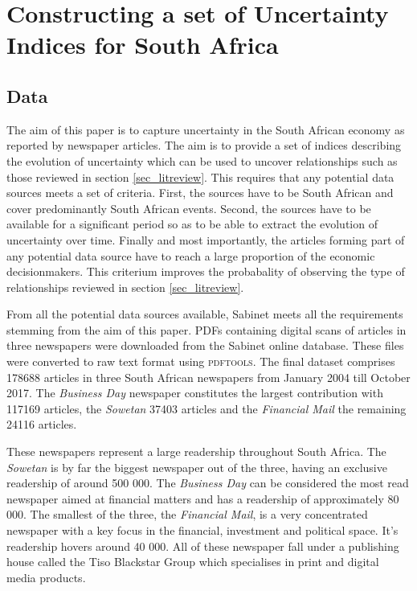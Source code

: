 \documentclass[11pt,preprint, authoryear]{elsarticle}
\numberwithin{equation}{section}
\numberwithin{figure}{section}
\numberwithin{table}{section}
\begin{document}
\section{\texorpdfstring{Constructing a set of Uncertainty Indices for
South Africa
\label{sec_EPU}}{Constructing a set of Uncertainty Indices for South Africa }}\label{constructing-a-set-of-uncertainty-indices-for-south-africa}

\subsection{\texorpdfstring{Data \label{sec_data}}{Data }}\label{data}

The aim of this paper is to capture uncertainty in the South African
economy as reported by newspaper articles. The aim is to provide a set
of indices describing the evolution of uncertainty which can be used to
uncover relationships such as those reviewed in section
\ref{sec_litreview}. This requires that any potential data sources meets
a set of criteria. First, the sources have to be South African and cover
predominantly South African events. Second, the sources have to be
available for a significant period so as to be able to extract the
evolution of uncertainty over time. Finally and most importantly, the
articles forming part of any potential data source have to reach a large
proportion of the economic decisionmakers. This criterium improves the
probabality of observing the type of relationships reviewed in section
\ref{sec_litreview}.

From all the potential data sources available, Sabinet meets all the
requirements stemming from the aim of this paper. PDFs containing
digital scans of articles in three newspapers were downloaded from the
Sabinet online database. These files were converted to raw text format
using \textsc{pdftools}. The final dataset comprises 178688 articles in
three South African newspapers from January 2004 till October 2017. The
\emph{Business Day} newspaper constitutes the largest contribution with
117169 articles, the \emph{Sowetan} 37403 articles and the
\emph{Financial Mail} the remaining 24116 articles.

These newspapers represent a large readership throughout South Africa.
The \emph{Sowetan} is by far the biggest newspaper out of the three,
having an exclusive readership of around 500 000. The
\emph{Business Day} can be considered the most read newspaper aimed at
financial matters and has a readership of approximately 80 000. The
smallest of the three, the \emph{Financial Mail}, is a very concentrated
newspaper with a key focus in the financial, investment and political
space. It's readership hovers around 40 000. All of these newspaper fall
under a publishing house called the Tiso Blackstar Group which
specialises in print and digital media products.
\end{document}

